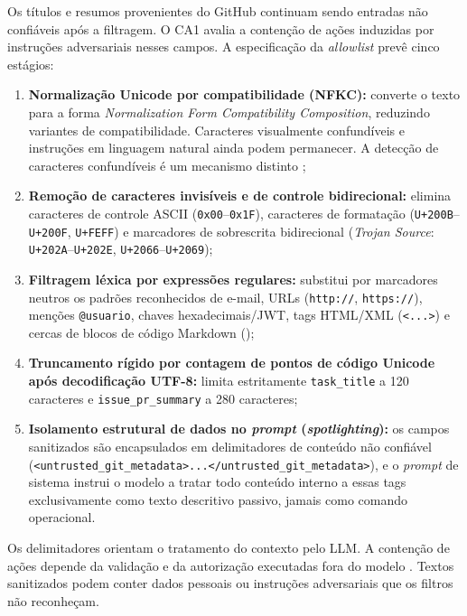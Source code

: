 \documentclass[12pt,openany,oneside,a4paper,english,brazilian,sumario=tradicional]{abntex2}
\begin{document}
Os títulos e resumos provenientes do GitHub continuam sendo entradas não confiáveis após a filtragem. O CA1 avalia a contenção de ações induzidas por instruções adversariais nesses campos. A especificação da \textit{allowlist} prevê cinco estágios:
\begin{enumerate}
  \item \textbf{Normalização Unicode por compatibilidade (NFKC):} converte o texto para a forma \textit{Normalization Form Compatibility Composition}, reduzindo variantes de compatibilidade. Caracteres visualmente confundíveis e instruções em linguagem natural ainda podem permanecer. A detecção de caracteres confundíveis é um mecanismo distinto \cite{unicode15,unicode39};
  \item \textbf{Remoção de caracteres invisíveis e de controle bidirecional:} elimina caracteres de controle ASCII (\texttt{0x00}--\texttt{0x1F}), caracteres de formatação (\texttt{U+200B}--\texttt{U+200F}, \texttt{U+FEFF}) e marcadores de sobrescrita bidirecional (\textit{Trojan Source}: \texttt{U+202A}--\texttt{U+202E}, \texttt{U+2066}--\texttt{U+2069});
  \item \textbf{Filtragem léxica por expressões regulares:} substitui por marcadores neutros os padrões reconhecidos de e-mail, URLs (\texttt{http:/\allowbreak /\allowbreak }, \texttt{https:/\allowbreak /\allowbreak }), menções \texttt{@usuario}, chaves hexadecimais/JWT, tags HTML/XML (\texttt{<...>}) e cercas de blocos de código Markdown (\texttt{\textasciigrave\textasciigrave\textasciigrave});
  \item \textbf{Truncamento rígido por contagem de pontos de código Unicode após decodificação UTF-8:} limita estritamente \texttt{task\_\allowbreak title} a 120 caracteres e \texttt{issue\_\allowbreak pr\_\allowbreak summary} a 280 caracteres;
  \item \textbf{Isolamento estrutural de dados no \textit{prompt} (\textit{spotlighting}):} os campos sanitizados são encapsulados em delimitadores de conteúdo não confiável (\texttt{<untrusted\_\allowbreak git\_\allowbreak }\allowbreak\texttt{metadata>...}\allowbreak\texttt{</\allowbreak untrusted\_\allowbreak git\_\allowbreak }\allowbreak\texttt{metadata>}), e o \textit{prompt} de sistema instrui o modelo a tratar todo conteúdo interno a essas tags exclusivamente como texto descritivo passivo, jamais como comando operacional.
\end{enumerate}
Os delimitadores orientam o tratamento do contexto pelo LLM. A contenção de ações depende da validação e da autorização executadas fora do modelo \cite{debenedetti2025camel,beurerkellner2025patterns}. Textos sanitizados podem conter dados pessoais ou instruções adversariais que os filtros não reconheçam.
\end{document}
